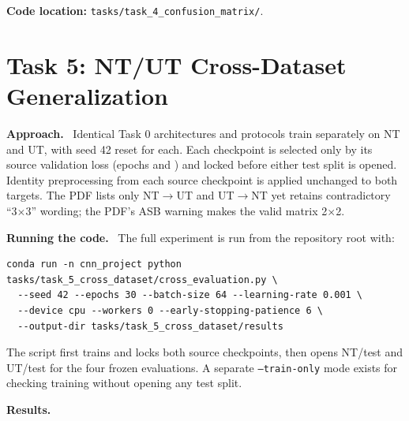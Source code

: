 \documentclass[10pt,a4paper]{article}
\newcommand{\TaskPage}[2]{%
  \clearpage
  \section{Task #1: #2}\label{task:#1:start}%
}
\newcommand{\TaskEnd}[1]{\label{task:#1:end}}
\newcommand{\RunHead}[1]{\par\smallskip\noindent\textbf{#1.}\ }
\newcommand{\CodePath}[1]{%
  \par\smallskip\noindent\textbf{Code location: }\nolinkurl{#1}.%
}
\begin{document}
\CodePath{tasks/task_4_confusion_matrix/}
\TaskEnd{4}

\TaskPage{5}{NT/UT Cross-Dataset Generalization}

\RunHead{Approach}
Identical Task 0 architectures and protocols train separately on NT and UT, with seed 42 reset
for each. Each checkpoint is selected only by its source validation loss (epochs
\TaskFiveNTBestEpoch{} and \TaskFiveUTBestEpoch{}) and locked before either test split is opened.
Identity preprocessing from each source checkpoint is applied unchanged to both targets.
The PDF lists only NT$\rightarrow$UT and UT$\rightarrow$NT yet retains contradictory ``3$\times$3''
wording; the PDF's ASB warning makes the valid matrix 2$\times$2.

\RunHead{Running the code}
The full experiment is run from the repository root with:
\begin{small}
\begin{verbatim}
conda run -n cnn_project python tasks/task_5_cross_dataset/cross_evaluation.py \
  --seed 42 --epochs 30 --batch-size 64 --learning-rate 0.001 \
  --device cpu --workers 0 --early-stopping-patience 6 \
  --output-dir tasks/task_5_cross_dataset/results
\end{verbatim}
\end{small}
The script first trains and locks both source checkpoints, then opens NT/test and UT/test for
the four frozen evaluations. A separate \texttt{--train-only} mode exists for checking training
without opening any test split.

\RunHead{Results}
\end{document}
